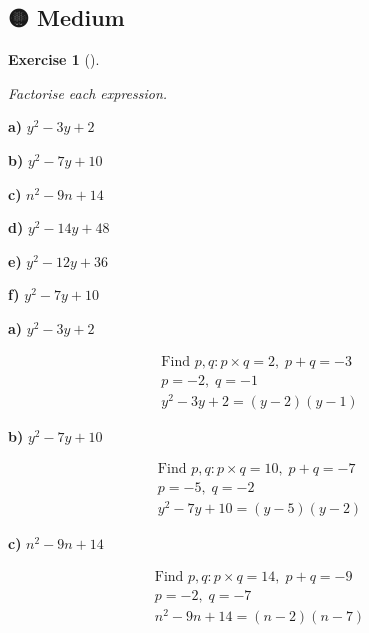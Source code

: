 \documentclass[
  letterpaper,
  DIV=11,
  numbers=noendperiod]{scrreprt}
\theoremstyle{definition}
\newtheorem{exercise}{Exercise}[chapter]
\theoremstyle{remark}
\begin{document}
\subsection{🟡 Medium}

\begin{exercise}[]\protect\hypertarget{exr-u6-3}{}\label{exr-u6-3}

\emph{Factorise each expression.}

\textbf{a)} \(\displaystyle y^2 - 3y + 2\)

\textbf{b)} \(\displaystyle y^2 - 7y + 10\)

\textbf{c)} \(\displaystyle n^2 - 9n + 14\)

\textbf{d)} \(\displaystyle y^2 - 14y + 48\)

\textbf{e)} \(\displaystyle y^2 - 12y + 36\)

\textbf{f)} \(\displaystyle y^2 - 7y + 10\)

\begin{tcolorbox}[enhanced jigsaw, opacitybacktitle=0.6, coltitle=black, arc=.35mm, colframe=quarto-callout-tip-color-frame, colback=white, bottomrule=.15mm, left=2mm, colbacktitle=quarto-callout-tip-color!10!white, titlerule=0mm, opacityback=0, title=\textcolor{quarto-callout-tip-color}{\faLightbulb}\hspace{0.5em}{🔍 View Solutions}, leftrule=.75mm, breakable, rightrule=.15mm, bottomtitle=1mm, toptitle=1mm, toprule=.15mm]

\textbf{a)} \(\displaystyle y^2 - 3y + 2\)

\begin{align*}
\text{Find } p, q: p \times q = 2,\; p + q = -3 \\ p = -2,\; q = -1 \\ y^2 - 3y + 2 = (y - 2)(y - 1)
\end{align*}

\textbf{b)} \(\displaystyle y^2 - 7y + 10\)

\begin{align*}
\text{Find } p, q: p \times q = 10,\; p + q = -7 \\ p = -5,\; q = -2 \\ y^2 - 7y + 10 = (y - 5)(y - 2)
\end{align*}

\textbf{c)} \(\displaystyle n^2 - 9n + 14\)

\begin{align*}
\text{Find } p, q: p \times q = 14,\; p + q = -9 \\ p = -2,\; q = -7 \\ n^2 - 9n + 14 = (n - 2)(n - 7)
\end{align*}


\end{tcolorbox}
\end{exercise}
\end{document}
